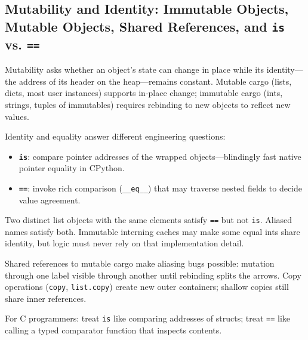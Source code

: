 \subsection{Mutability and Identity: Immutable Objects, Mutable Objects, Shared References, and \texttt{is} vs. \texttt{==}}

Mutability asks whether an object's state can change in place while its identity---the address of its header on the heap---remains constant. Mutable cargo (lists, dicts, most user instances) supports in-place change; immutable cargo (ints, strings, tuples of immutables) requires rebinding to new objects to reflect new values.

Identity and equality answer different engineering questions:

\begin{itemize}
    \item \textbf{\texttt{is}}: compare pointer addresses of the wrapped objects---blindingly fast native pointer equality in CPython.
    \item \textbf{\texttt{==}}: invoke rich comparison (\texttt{\_\_eq\_\_}) that may traverse nested fields to decide value agreement.
\end{itemize}

Two distinct list objects with the same elements satisfy \texttt{==} but not \texttt{is}. Aliased names satisfy both. Immutable interning caches may make some equal ints share identity, but logic must never rely on that implementation detail.

Shared references to mutable cargo make aliasing bugs possible: mutation through one label visible through another until rebinding splits the arrows. Copy operations (\texttt{copy}, \texttt{list.copy}) create new outer containers; shallow copies still share inner references.

For C programmers: treat \texttt{is} like comparing addresses of structs; treat \texttt{==} like calling a typed comparator function that inspects contents.
